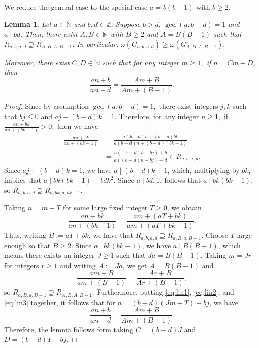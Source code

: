 \documentclass[12pt, reqno, a4paper]{amsart}
\newtheorem{lemma}{Lemma}[section]
\theoremstyle{definition}
\theoremstyle{remark}
\numberwithin{equation}{section}
\newcommand{\N}{\mathbb{N}}
\renewcommand{\leq}{\leqslant}
\renewcommand{\geq}{\geqslant}
\begin{document}
We reduce the general case to the special case $a = b(b-1)$ with $b\geq 2$. 


 \begin{lemma} \label{lem:reduction}
 Let $a \in \mathbb{N}$ and $b, d \in \mathbb{Z}.$  Suppose $b>d, \, \gcd(a,b-d)=1$ and $a \mid bd.$ Then, there exist $A,B\in\N$ with $B\geq 2$ and $A=B(B-1)$ such that $R_{a,b,a,d} \supseteq R_{A, B, A, B-1 }$. In particular, $\omega(G_{a,b,a,d}) \geq \omega(G_{A, B, A, B-1 }).$
 
 Moreover, there exist $C,D\in\N$ such that for any integer $m \geq 1,$ if $n = Cm+D$, then
 \[ \frac{an + b}{an+d} = \frac{Am+B}{Am+(B-1)}. \]
 \end{lemma}

 \begin{proof}
Since by assumption $\gcd (a,b-d)=1,$ there exist integers $j,k$ such that $bj \leq 0$ and $aj+(b-d)k=1.$ Therefore, for any integer $n \geq 1,$ if  $\frac{an+bk}{an+(bk-1)} >0,$ then we have
 \begin{align}
 \frac{an+bk}{an+(bk-1)} &= \frac{a(b-d)n+(b-d)bk}{a(b-d)n+(b-d)(bk-1)} \nonumber \\
 &=  \frac{a((b-d)n-bj)+b}{a((b-d)n-bj)+d}
 \in R_{a,b,a,d}. \label{eq:lin1}
 \end{align}
 Since $aj+(b-d)k=1$, we have $a\mid (b-d)k-1$, which, multiplying by $bk$, implies that $a\mid bk(bk-1)-bdk^2$. Since $a\mid bd$, it follows that $a\mid bk(bk-1)$, so $R_{a,b,a,d} \supseteq R_{a, bk, a, bk-1 }$.

 Taking $n = m + T$ for some large fixed integer $T\geq 0$, we obtain
 \begin{equation}
    \frac{an+bk}{an+(bk-1)} = \frac{am + (aT+bk)}{am+(aT+bk-1)}. \label{eq:lin2}
 \end{equation}
 Thus, writing $B:=aT+bk$, we have that $R_{a,b,a,d} \supseteq R_{a,B,a,B-1}$. Choose $T$ large enough so that $B\geq 2$. Since $a\mid bk(bk-1)$, we have $a\mid B(B-1)$, which means there exists an integer $J\geq 1$ such that $Ja = B(B-1)$. Taking $m = Jr$ for integers $r \geq 1$ and writing $A := Ja$, we get $A=B(B-1)$ and
 \begin{equation}
     \frac{am+B}{am+(B-1)} = \frac{Ar+B}{Ar+(B-1)}, \label{eq:lin3}
 \end{equation} 
 so $R_{a,B,a,B-1} \supseteq R_{A,B,A,B-1}.$ Furthermore, putting \eqref{eq:lin1}, \eqref{eq:lin2}, and \eqref{eq:lin3} together, it follows that for $n = (b-d)(Jm+T) -bj$, we have
 \[ \frac{an + b}{an+d} = \frac{Am+B}{Am+(B-1)}. \]
Therefore, the lemma follows form taking $C= (b-d)J$ and $D=(b-d)T - bj$.
 \end{proof}
\end{document}
